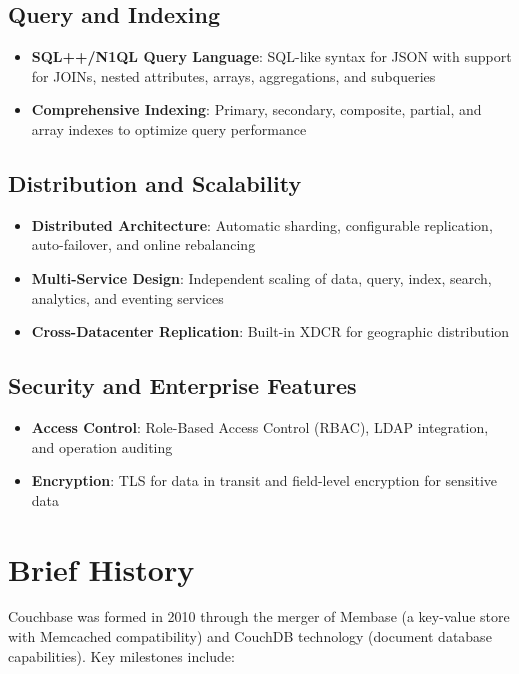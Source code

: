 \subsection{Query and Indexing}
\begin{itemize}
  \item \textbf{SQL++/N1QL Query Language}: SQL-like syntax for JSON with support for JOINs, nested attributes, arrays, aggregations, and subqueries
  \item \textbf{Comprehensive Indexing}: Primary, secondary, composite, partial, and array indexes to optimize query performance
\end{itemize}

\subsection{Distribution and Scalability}
\begin{itemize}
  \item \textbf{Distributed Architecture}: Automatic sharding, configurable replication, auto-failover, and online rebalancing
  \item \textbf{Multi-Service Design}: Independent scaling of data, query, index, search, analytics, and eventing services
  \item \textbf{Cross-Datacenter Replication}: Built-in XDCR for geographic distribution
\end{itemize}

\subsection{Security and Enterprise Features}
\begin{itemize}
  \item \textbf{Access Control}: Role-Based Access Control (RBAC), LDAP integration, and operation auditing
  \item \textbf{Encryption}: TLS for data in transit and field-level encryption for sensitive data
\end{itemize}


\section{Brief History}

Couchbase was formed in 2010 through the merger of Membase (a key-value store with Memcached compatibility) and CouchDB technology (document database capabilities). Key milestones include:

